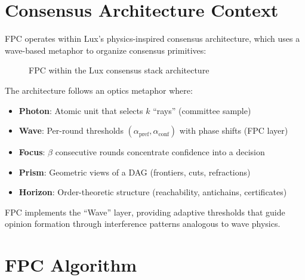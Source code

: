\documentclass[11pt,a4paper]{article}
\begin{document}
\section{Consensus Architecture Context}
\label{sec:architecture}

FPC operates within Lux's physics-inspired consensus architecture, which uses a wave-based metaphor to organize consensus primitives:

\begin{figure}[h]
\centering
{}
\caption{FPC within the Lux consensus stack architecture}
\label{fig:architecture}
\end{figure}

The architecture follows an optics metaphor where:
\begin{itemize}
\item \textbf{Photon}: Atomic unit that selects $k$ ``rays'' (committee sample)
\item \textbf{Wave}: Per-round thresholds $(\alpha_{\text{pref}}, \alpha_{\text{conf}})$ with phase shifts (FPC layer)
\item \textbf{Focus}: $\beta$ consecutive rounds concentrate confidence into a decision
\item \textbf{Prism}: Geometric views of a DAG (frontiers, cuts, refractions)
\item \textbf{Horizon}: Order-theoretic structure (reachability, antichains, certificates)
\end{itemize}

FPC implements the ``Wave'' layer, providing adaptive thresholds that guide opinion formation through interference patterns analogous to wave physics.

\section{FPC Algorithm}
\label{sec:algorithm}
\end{document}
